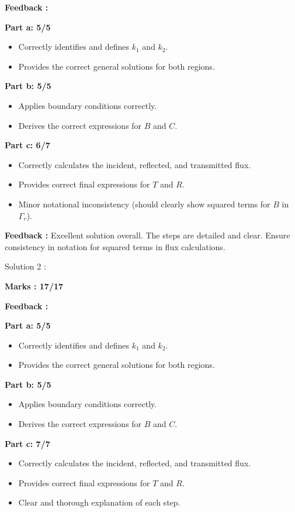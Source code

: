 \documentclass[a4paper,11pt]{article}
\begin{document}
\textbf{Feedback :}

\textbf{Part a: 5/5}
\begin{itemize}
    \item Correctly identifies and defines $k_1$ and $k_2$.
    \item Provides the correct general solutions for both regions.
\end{itemize}


\textbf{Part b: 5/5}
\begin{itemize}
    \item Applies boundary conditions correctly.
    \item Derives the correct expressions for $B$ and $C$.
\end{itemize}

\textbf{Part c: 6/7}
\begin{itemize}
    \item Correctly calculates the incident, reflected, and transmitted flux.
    \item Provides correct final expressions for $T$ and $R$.
    \item Minor notational inconsistency (should clearly show squared terms for $B$ in $\Gamma_r$).
\end{itemize}


\textbf{Feedback :}
Excellent solution overall. The steps are detailed and clear. Ensure consistency in notation for squared terms in flux calculations.


Solution 2 :

\textbf{Marks : 17/17}

\textbf{Feedback :}

\textbf{Part a: 5/5}
\begin{itemize}
    \item Correctly identifies and defines $k_1$ and $k_2$.
    \item Provides the correct general solutions for both regions.
\end{itemize}


\textbf{Part b: 5/5}
\begin{itemize}
    \item Applies boundary conditions correctly.
    \item Derives the correct expressions for $B$ and $C$.
\end{itemize}

\textbf{Part c: 7/7}
\begin{itemize}
    \item Correctly calculates the incident, reflected, and transmitted flux.
    \item Provides correct final expressions for $T$ and $R$.
    \item Clear and thorough explanation of each step.
\end{itemize}
\end{document}
